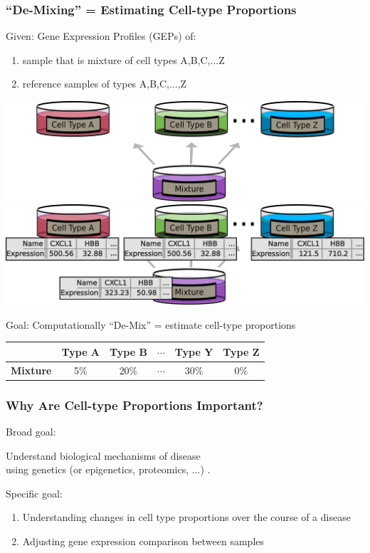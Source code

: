 \documentclass[usenames,dvipsnames,15pt,handout]{beamer}
\renewcommand{\alert}[1]{{\color{NavyBlue} #1}}
\begin{document}
\begin{frame}
  \frametitle{``De-Mixing'' = Estimating Cell-type Proportions}
  \alert{\large Given:} Gene Expression Profiles (GEPs) of:
  \begin{enumerate}
  \item sample that is mixture of cell types A,B,C,...Z
  \item reference samples of types A,B,C,...,Z\\
  \end{enumerate}
  \hspace{1cm}\begin{center}
    \begin{overprint}
      \hspace{-.75cm}\includegraphics[scale=.28]{pictures/mixture_cartoon}
      \hspace*{-.77cm}\includegraphics[scale=.28]{pictures/mixture_cartoon_data}
    \end{overprint}
  \end{center}
  \alert{\large Goal:} Computationally ``De-Mix'' = estimate cell-type proportions
  {\scriptsize \begin{center}\begin{tabular}{c||c|c|c|c|c}
      & \bf Type A& \bf Type B& $\cdots$& \bf Type Y&\bf  Type Z\\\hline\hline
    \bf Mixture& 5\%& 20\%& $\cdots$& 30\%& 0\%
  \end{tabular}\end{center}}
\end{frame}

\begin{frame}
  \frametitle{Why Are Cell-type Proportions Important?}
    {\Large\alert{ Broad goal:}\\\begin{center} Understand biological mechanisms of disease\\ using \alert{genetics} (or epigenetics, proteomics, ...) .\end{center}}
    {\Large\alert{ Specific goal:}}
    \begin{enumerate}
    \item Understanding changes in cell type proportions over the course of a disease
    \item Adjusting gene expression comparison between samples
    \end{enumerate}
\end{frame}
\end{document}
